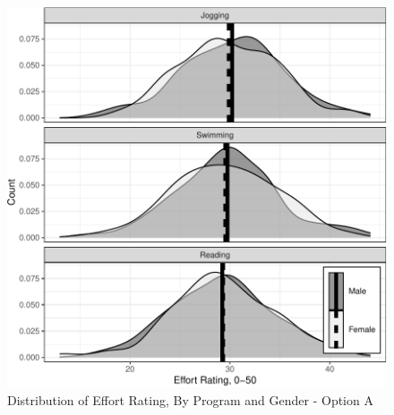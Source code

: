 \documentclass[
]{article}
\begin{document}
\begin{figure}[hb]

\includegraphics{Appendix_ex_weightloss_files/figure-latex/unnamed-chunk-57-1} \hfill{}

\caption{Distribution of Effort Rating, By Program and Gender - Option A}\label{fig:unnamed-chunk-57}
\end{figure}

\clearpage
\end{document}
